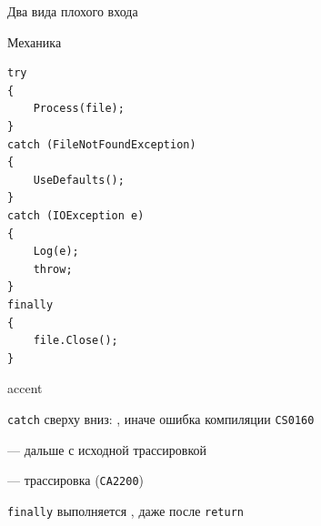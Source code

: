 \documentclass[aspectratio=169,10pt,t]{beamer}
\begin{document}
\begin{frame}{Два вида плохого входа}
  \slidetop

  \slidegap
\end{frame}

\begin{frame}[fragile]{Механика}
  \slidetop
  \begin{minipage}[t]{0.52\textwidth}
\begin{lstlisting}[style=csharp,basicstyle=\ttfamily\scriptsize]
try
{
    Process(file);
}
catch (FileNotFoundException)
{
    UseDefaults();
}
catch (IOException e)
{
    Log(e);
    throw;
}
finally
{
    file.Close();
}
\end{lstlisting}
  \end{minipage}\hfill
  \begin{minipage}[t]{0.44\textwidth}
    \vspace{0.2em}
    \begin{cbul}{accent}
      \item \texttt{catch} сверху вниз: , иначе
            ошибка компиляции \texttt{CS0160}
      \item \texttt{} --- дальше с исходной трассировкой
      \item \texttt{} --- трассировка 
            (\texttt{CA2200})
      \item \texttt{finally} выполняется , даже после
            \texttt{return}
    \end{cbul}
  \end{minipage}
\end{frame}
\end{document}
